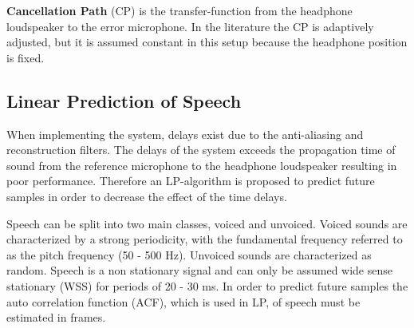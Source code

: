 \textbf{Cancellation Path} (CP) is the transfer-function from the headphone loudspeaker to the error microphone. In the literature \cite{Hansen} the CP is adaptively adjusted, but it is assumed constant in this setup because the headphone position is fixed.     

\subsection*{Linear Prediction of Speech}
When implementing the system, delays exist due to the anti-aliasing and reconstruction filters. The delays of the system exceeds the propagation time of sound from the reference microphone to the headphone loudspeaker resulting in poor performance. Therefore an LP-algorithm is proposed to predict future samples in order to decrease the effect of the time delays.


Speech can be split into two main classes, voiced and unvoiced. Voiced sounds are characterized by a strong periodicity, with the fundamental frequency referred to as the pitch frequency (50 - 500 Hz). Unvoiced sounds are characterized as random. Speech is a non stationary signal and can only be assumed wide sense stationary (WSS) for periods of 20 - 30 ms. In order to predict future samples the auto correlation function (ACF), which is used in LP, of speech must be estimated in frames. 


